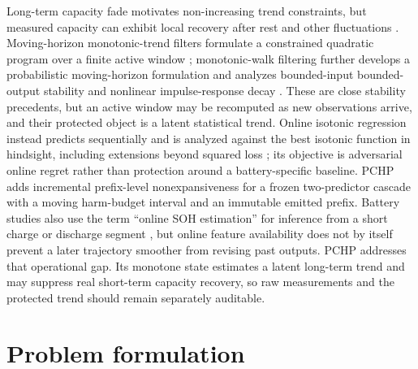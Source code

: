 \documentclass[preprint,12pt]{elsarticle}
\begin{document}
Long-term capacity fade motivates non-increasing trend constraints, but measured capacity can exhibit local recovery after rest and other fluctuations \citep{ma2021regeneration}. Moving-horizon monotonic-trend filters formulate a constrained quadratic program over a finite active window \citep{samar2004moving}; monotonic-walk filtering further develops a probabilistic moving-horizon formulation and analyzes bounded-input bounded-output stability and nonlinear impulse-response decay \citep{gorinevsky2008efficient}. These are close stability precedents, but an active window may be recomputed as new observations arrive, and their protected object is a latent statistical trend. Online isotonic regression instead predicts sequentially and is analyzed against the best isotonic function in hindsight, including extensions beyond squared loss \citep{kotlowski2016online}; its objective is adversarial online regret rather than protection around a battery-specific baseline. PCHP adds incremental prefix-level nonexpansiveness for a frozen two-predictor cascade with a moving harm-budget interval and an immutable emitted prefix. Battery studies also use the term ``online SOH estimation'' for inference from a short charge or discharge segment \citep{liu2020online}, but online feature availability does not by itself prevent a later trajectory smoother from revising past outputs. PCHP addresses that operational gap. Its monotone state estimates a latent long-term trend and may suppress real short-term capacity recovery, so raw measurements and the protected trend should remain separately auditable.

\section{Problem formulation}
\end{document}
